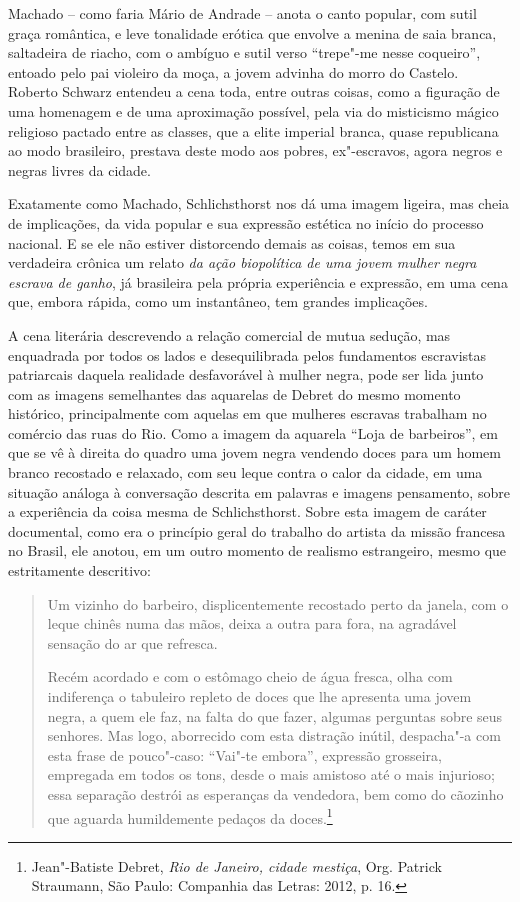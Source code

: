 Machado -- como faria Mário de Andrade -- anota o canto popular, com
sutil graça romântica, e leve tonalidade erótica que envolve a menina de
saia branca, saltadeira de riacho, com o ambíguo e sutil verso
``trepe"-me nesse coqueiro'', entoado pelo pai violeiro da moça, a jovem
advinha do morro do Castelo. Roberto Schwarz entendeu a cena toda, entre
outras coisas, como a figuração de uma homenagem e de uma aproximação
possível, pela via do misticismo mágico religioso pactado entre as
classes, que a elite imperial branca, quase republicana ao modo
brasileiro, prestava deste modo aos pobres, ex"-escravos, agora negros e
negras livres da cidade.

Exatamente como Machado, Schlichsthorst nos dá uma imagem ligeira, mas
cheia de implicações, da vida popular e sua expressão estética no início
do processo nacional. E se ele não estiver distorcendo demais as coisas,
temos em sua verdadeira crônica um relato \emph{da ação biopolítica de
uma jovem mulher negra escrava de ganho}, já brasileira pela própria
experiência e expressão, em uma cena que, embora rápida, como um
instantâneo, tem grandes implicações.

A cena literária descrevendo a relação comercial de mutua sedução, mas
enquadrada por todos os lados e desequilibrada pelos fundamentos
escravistas patriarcais daquela realidade desfavorável à mulher negra,
pode ser lida junto com as imagens semelhantes das aquarelas de Debret
do mesmo momento histórico, principalmente com aquelas em que mulheres
escravas trabalham no comércio das ruas do Rio. Como a imagem da
aquarela ``Loja de barbeiros'', em que se vê à direita do quadro uma
jovem negra vendendo doces para um homem branco recostado e relaxado,
com seu leque contra o calor da cidade, em uma situação análoga à
conversação descrita em palavras e imagens pensamento, sobre a
experiência da coisa mesma de Schlichsthorst. Sobre esta imagem de
caráter documental, como era o princípio geral do trabalho do artista da
missão francesa no Brasil, ele anotou, em um outro momento de realismo
estrangeiro, mesmo que estritamente descritivo:

\begin{quote}
Um vizinho do barbeiro, displicentemente recostado perto da janela,
com o leque chinês numa das mãos, deixa a outra para fora, na agradável
sensação do ar que refresca.

Recém acordado e com o estômago cheio de água fresca, olha com indiferença o tabuleiro repleto de doces que lhe apresenta uma jovem negra, a quem ele faz, na falta do que fazer, algumas perguntas sobre seus senhores. Mas logo, aborrecido com esta
distração inútil, despacha"-a com esta frase de pouco"-caso: ``Vai"-te
embora'', expressão grosseira, empregada em todos os tons, desde o mais
amistoso até o mais injurioso; essa separação destrói as esperanças da
vendedora, bem como do cãozinho que aguarda humildemente pedaços da
doces.\footnote{Jean"-Batiste Debret, \emph{Rio de Janeiro, cidade mestiça}, Org. Patrick Straumann, São Paulo: Companhia
  das Letras: 2012, p. 16.}
\end{quote}

